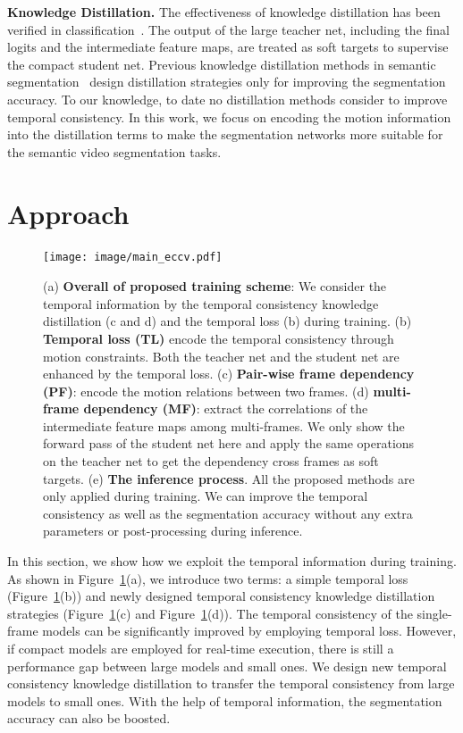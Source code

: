 \documentclass[runningheads]{llncs}
\begin{document}
\noindent\textbf{Knowledge Distillation.}
The effectiveness of knowledge distillation has been verified in classification~\cite{hinton2015distilling,romero2014fitnets,Zagoruyko2016PayingMA}. The output of the large teacher net, including the final logits and the intermediate feature maps, are treated as soft targets to supervise the compact student net.
Previous knowledge distillation methods in semantic segmentation~\cite{he2019knowledge,liu2019structured} design distillation
strategies
only for improving the segmentation accuracy.
To our knowledge, to date no distillation methods consider to improve
temporal consistency. In this work, we focus on encoding the motion information into the distillation
terms
to make the segmentation networks more suitable for the semantic video segmentation tasks.



\section{Approach}

\begin{figure}[htbp]
    \centering
    \texttt{[image: image/main\_eccv.pdf]}
\     \caption{(a) \textbf{Overall of proposed training scheme}: We consider the temporal information by the temporal consistency knowledge distillation (c and d) and the temporal loss (b) during training. (b) \textbf{Temporal loss (TL)} encode the temporal consistency through motion constraints. Both the teacher net and the student net are enhanced by the temporal loss. (c) \textbf{Pair-wise frame dependency (PF)}: encode the motion relations between two frames. (d) \textbf{multi-frame dependency (MF)}: extract the correlations of the intermediate feature maps among multi-frames.  We only show the forward pass of the student net here and apply the same operations on the teacher net to get the dependency cross frames as soft targets. (e) \textbf{The inference process}. All the proposed methods are only applied during training. We can improve the temporal consistency as well as the segmentation accuracy without any extra parameters or post-processing during inference.}
    \label{fig:overall}
\end{figure}

In this section, we show how we
exploit
the temporal information during training. As shown in  Figure~\ref{fig:overall}(a), we introduce two terms:
a
simple
temporal loss (Figure~\ref{fig:overall}(b)) and newly designed temporal consistency knowledge distillation
strategies
(Figure~\ref{fig:overall}(c) and Figure~\ref{fig:overall}(d)). The temporal consistency of the single-frame models can be significantly improved by employing temporal loss. However, if compact models are employed for real-time execution, there is still a performance gap between large models and small ones. We design new
temporal consistency knowledge distillation
to transfer the temporal consistency from large models to small ones. With the help of temporal information, the segmentation accuracy can also be boosted.
\end{document}
